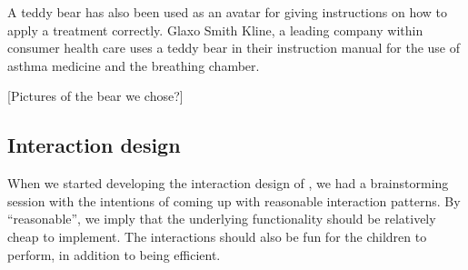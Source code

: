 A teddy bear has also been used as an avatar for giving instructions on how to apply a treatment correctly. Glaxo Smith Kline, a leading company within consumer health care uses a teddy bear in their instruction manual for the use of asthma medicine and the breathing chamber\cite{glaxosmithkline}. 

[Pictures of the bear we chose?]

\subsection{Interaction design}
When we started developing the interaction design of \buddy{}, we had a brainstorming session with the intentions of coming up with reasonable interaction patterns.        
By ``reasonable'', we imply that the underlying functionality should be relatively cheap to implement. The interactions should also be fun for the children to perform, in addition to being efficient.  

